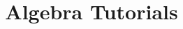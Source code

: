 \documentclass[a4paper, answers]{exam}
\title{Algebra Tutorials}
\author{}
\begin{document}
    \maketitle
    \begin{questions}
%       
%       
%       
        
    \end{questions}
\end{document}
